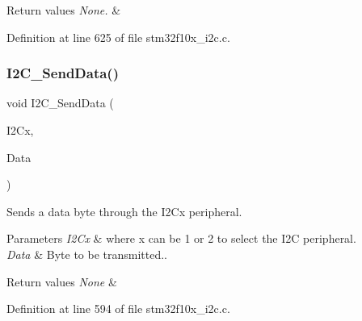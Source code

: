 \begin{DoxyRetVals}{Return values}
{\em None.} & \\
\hline
\end{DoxyRetVals}


Definition at line 625 of file stm32f10x\+\_\+i2c.\+c.

\mbox{\label{group___i2_c___private___functions_ga7bd9e70b8eafde0dd5eb42b0d95fe1a9}} 
\subsubsection{\texorpdfstring{I2\+C\+\_\+\+Send\+Data()}{I2C\_SendData()}}
{\footnotesize\ttfamily void I2\+C\+\_\+\+Send\+Data (\begin{DoxyParamCaption}\item[{\hyperlink{struct_i2_c___type_def}{I2\+C\+\_\+\+Type\+Def} $\ast$}]{I2\+Cx,  }\item[{uint8\+\_\+t}]{Data }\end{DoxyParamCaption})}



Sends a data byte through the I2\+Cx peripheral. 


\begin{DoxyParams}{Parameters}
{\em I2\+Cx} & where x can be 1 or 2 to select the I2C peripheral. \\
\hline
{\em Data} & Byte to be transmitted.. \\
\hline
\end{DoxyParams}

\begin{DoxyRetVals}{Return values}
{\em None} & \\
\hline
\end{DoxyRetVals}


Definition at line 594 of file stm32f10x\+\_\+i2c.\+c.

\mbox{\label{group___i2_c___private___functions_ga75a810776d9710d2f6d9c5d9e93241c6}} 
